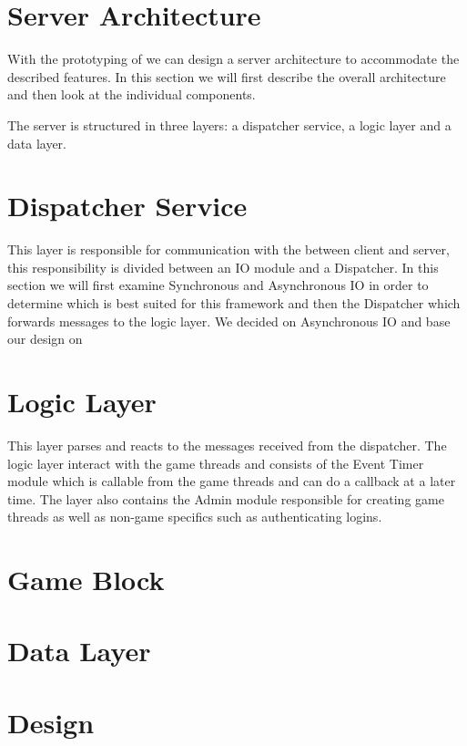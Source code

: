 \section{Server Architecture}
\label{sec:server}
With the prototyping of  we can design a server architecture to accommodate the described features. In this section we will first describe the overall architecture and then look at the individual components.


The server is structured in three layers: a dispatcher service, a logic layer and a data layer. 




\section{Dispatcher Service}
This layer is responsible for communication with the between client and server, this responsibility is divided between an IO module and a Dispatcher. In this section we will first examine Synchronous and Asynchronous IO in order to determine which is best suited for this framework and then the Dispatcher which forwards messages to the logic layer. We decided on Asynchronous IO and base our design on \cite{?} 	 %







\section{Logic Layer}
This layer parses and reacts to the messages received from the dispatcher. The logic layer interact with the game threads and consists of the Event Timer module which is callable from the game threads and can do a callback at a later time. The layer also contains the Admin module responsible for creating game threads as well as non-game specifics such as authenticating logins.




\section{Game Block}



\section{Data Layer}



\section{Design}
